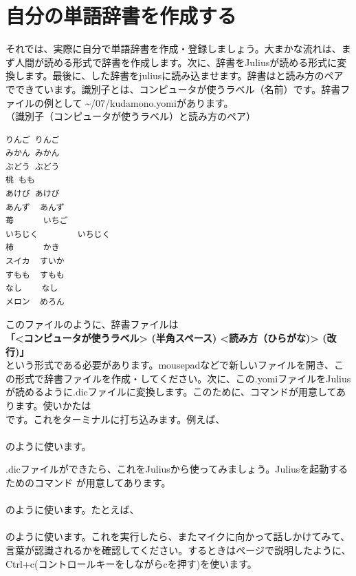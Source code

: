 \documentclass[text06.tex]{subfiles}
\begin{document}
\newpage
\section{自分の単語辞書を作成する}
それでは、実際に自分で単語辞書を作成・登録しましょう。大まかな流れは、まず人間が読める形式で辞書を作成します。次に、辞書をJuliusが読める形式に変換します。最後に、した辞書をjuliusに読み込ませます。辞書はと読み方のペアでできています。識別子とは、コンピュータが使うラベル（名前）です。辞書ファイルの例として \textasciitilde /07/kudamono.yomiがあります。\\

（識別子（コンピュータが使うラベル）と読み方のペア）


\begin{lstlisting}[caption=kudamino.yomi,label=kudamino.yomi]
りんご りんご
みかん みかん
ぶどう ぶどう
桃 もも
あけび あけび
あんず  あんず
苺      いちご
いちじく        いちじく
柿      かき
スイカ  すいか
すもも  すもも
なし    なし
メロン  めろん
\end{lstlisting}

このファイルのように、辞書ファイルは\\
\textbf{「<コンピュータが使うラベル> (半角スペース) <読み方（ひらがな)> (改行)」}\\
という形式である必要があります。mousepadなどで新しいファイルを開き、この形式で辞書ファイルを作成・してください。次に、この.yomiファイルをJuliusが読めるように.dicファイルに変換します。このために、コマンドが用意してあります。使いかたは\\
です。これをターミナルに打ち込みます。例えば、\\
\\
のように使います。

.dicファイルができたら、これをJuliusから使ってみましょう。Juliusを起動するためのコマンド  が用意してあります。\\
\\
のように使います。たとえば、\\
\\
のように使います。これを実行したら、またマイクに向かって話しかけてみて、言葉が認識されるかを確認してください。するときは\pageref{Julius}ページで説明したように、Ctrl+c(コントロールキーをしながらcを押す)を使います。
\end{document}
